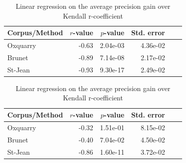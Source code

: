 \begin{table}
  \centering
  \caption{Linear regression on the average precision gain over Kendall r-coefficient}
  \label{tab:rl_correlations_regression}

  \begin{tabular}{l r r r r r}
    \toprule
    Corpus/Method & $r$-value & $p$-value & Std. error \\
    \midrule
    Oxquarry & -0.63 & 2.04e-03 & 4.36e-02 \\
    Brunet   & -0.89 & 7.14e-08 & 2.17e-02 \\
    St-Jean  & -0.93 & 9.30e-17 & 2.49e-02 \\
    \bottomrule
  \end{tabular}

  \vspace{0.5cm}

  \begin{tabular}{l r r r r r}
    \toprule
    Corpus/Method & $r$-value & $p$-value & Std. error \\
    \midrule
    Oxquarry  & -0.32 & 1.51e-01 & 8.15e-02 \\
    Brunet    & -0.40 & 7.04e-02 & 4.50e-02 \\
    St-Jean   & -0.86 & 1.60e-11 & 3.72e-02 \\
    \bottomrule
  \end{tabular}
\end{table}
